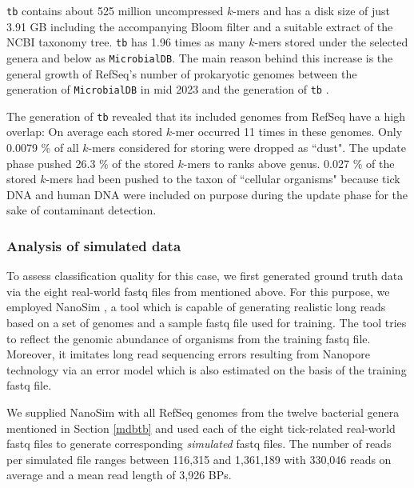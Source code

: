 \documentclass[pdflatex,sn-vancouver-num]{sn-jnl}
\begin{document}
    \texttt{tb} contains about 525 million uncompressed $k$-mers and has a disk size of just 3.91 GB including the accompanying Bloom filter and a suitable extract of the NCBI taxonomy tree. \texttt{tb} has 1.96 times as many $k$-mers stored under the selected genera and below as \texttt{MicrobialDB}. The main reason behind this increase is the general growth of RefSeq's number of prokaryotic genomes between the generation of \texttt{MicrobialDB} in mid 2023 and the generation of \texttt{tb} \citep{10.1093/nar/gkae1038}.

    The generation of \texttt{tb} revealed that its included genomes from RefSeq have a high overlap: On average each stored $k$-mer occurred 11 times in these genomes. Only 0.0079 \% of all $k$-mers considered for storing were dropped as ``dust". The update phase pushed 26.3 \% of the stored $k$-mers to ranks above genus. 0.027 \% of the stored $k$-mers had been pushed to the taxon of ``cellular organisms" because tick DNA and human DNA were included on purpose during the update phase for the sake of contaminant detection.

\subsubsection{Analysis of simulated data}
\label{ticksim}

To assess classification quality for this case, we first generated ground truth data via the eight real-world fastq files from \cite{nanoporeticks} mentioned above. For this purpose, we employed NanoSim \cite{10.1093/gigascience/gix010, 10.1093/gigascience/giad013}, a tool which is capable of generating realistic long reads based on a set of genomes and a sample fastq file used for training. The tool tries to reflect the genomic abundance of organisms from the training fastq file. Moreover, it imitates long read sequencing errors resulting from Nanopore technology via an error model which is also estimated on the basis of the training fastq file.

We supplied NanoSim with all RefSeq genomes from the twelve bacterial genera mentioned in Section \ref{mdbtb} and used each of the eight tick-related real-world fastq files to generate  corresponding \emph{simulated} fastq files.
 The number of reads per simulated file ranges between 116,315 and 1,361,189 with 330,046 reads on average and a mean read length of 3,926 BPs.
 
\end{document}

